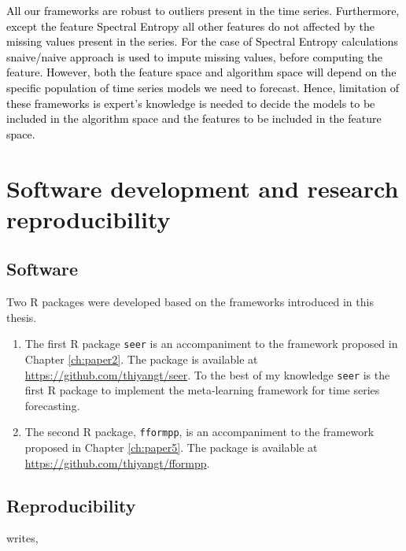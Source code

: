 \documentclass{monashthesis}
\begin{document}
\textcolor{black}{All our frameworks are robust to outliers present in the time series. Furthermore, except the feature Spectral Entropy all other features do not affected by the missing values present in the series. For the case of Spectral Entropy calculations snaive/naive approach is used to impute missing values, before computing the feature. However, both the feature space and algorithm space will depend on the specific population of time series models we need to forecast. Hence, limitation of these frameworks is expert's knowledge is needed to decide the models to be included in the algorithm space and the features to be included in the feature space.}

\hypertarget{software-development-and-research-reproducibility}{%
\section{Software development and research reproducibility}\label{software-development-and-research-reproducibility}}

\hypertarget{software}{%
\subsection{Software}\label{software}}

Two R packages were developed based on the frameworks introduced in this thesis.

\begin{enumerate}
\def\labelenumi{\arabic{enumi}.}
\item
  The first R package \texttt{seer} is an accompaniment to the framework proposed in Chapter \ref{ch:paper2}.
  The package is available at \url{https://github.com/thiyangt/seer}. To the best of my knowledge \texttt{seer} is the first R package to implement the meta-learning framework for time series forecasting.
\item
  The second R package, \texttt{fformpp}, is an accompaniment to the framework proposed in Chapter \ref{ch:paper5}. The package is available at \url{https://github.com/thiyangt/fformpp}.
\end{enumerate}

\hypertarget{reproducibility}{%
\subsection{Reproducibility}\label{reproducibility}}

\textcite{peng2015reproducibility} writes,
\end{document}
